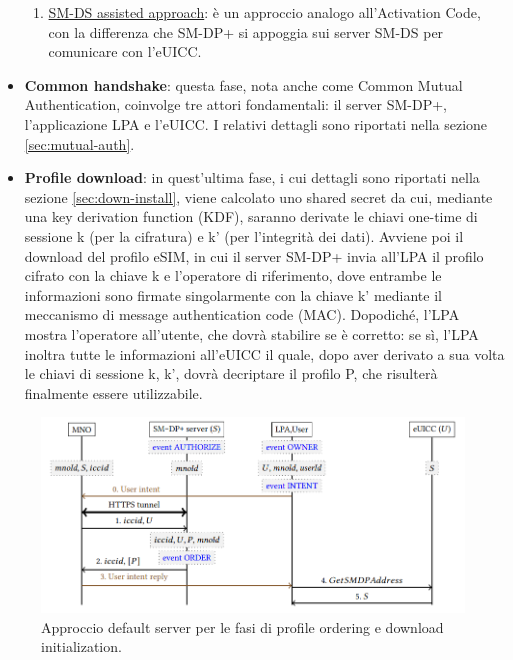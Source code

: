 \documentclass[10pt, oneside]{book}
\begin{document}
\begin{itemize}
\begin{enumerate}
\item \underline{SM-DS assisted approach}: è un approccio analogo all'Activation Code, con la differenza che SM-DP+ si appoggia sui server SM-DS per comunicare con l'eUICC.
\end{enumerate}
\item \textbf{Common handshake}: questa fase, nota anche come Common Mutual Authentication, coinvolge tre attori fondamentali: il server SM-DP+, l'applicazione LPA e l'eUICC. I relativi dettagli sono riportati nella sezione \ref{sec:mutual-auth}.
\item \textbf{Profile download}: in quest'ultima fase, i cui dettagli sono riportati nella sezione \ref{sec:down-install}, viene calcolato uno shared secret da cui, mediante una key derivation function (KDF), saranno derivate le chiavi one-time di sessione k (per la cifratura) e k' (per l'integrità dei dati). Avviene poi il download del profilo eSIM, in cui il server SM-DP+ invia all'LPA il profilo cifrato con la chiave k e l'operatore di riferimento, dove entrambe le informazioni sono firmate singolarmente con la chiave k' mediante il meccanismo di message authentication code (MAC). Dopodiché, l'LPA mostra l'operatore all'utente, che dovrà stabilire se è corretto: se sì, l'LPA inoltra tutte le informazioni all'eUICC il quale, dopo aver derivato a sua volta le chiavi di sessione k, k', dovrà decriptare il profilo P, che risulterà finalmente essere utilizzabile.
\end{itemize}
\begin{figure}
\includegraphics[width=\linewidth]{default-server.png}
\caption{Approccio default server per le fasi di profile ordering e download initialization.}
\label{fig:default-server}
\end{figure}
\end{document}

